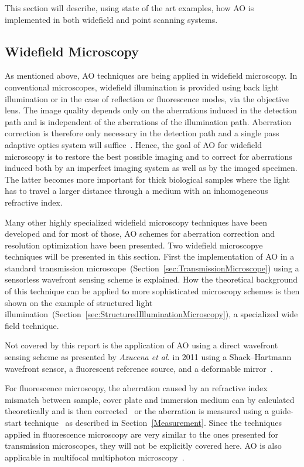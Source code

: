 This section will describe, using state of the art examples, how AO is implemented in both widefield and point scanning systems.  


\subsection{Widefield Microscopy}
\label{sec:WidefieldMicroscopy}

As mentioned above, AO techniques are being applied in widefield microscopy. In conventional microscopes, widefield illumination is provided using back light illumination or in the case of reflection or fluorescence modes, via the objective lens. The image quality depends only on the aberrations induced in the detection path and is independent of the aberrations of the illumination path. Aberration correction is therefore only necessary in the detection path and a single pass adaptive optics system will suffice~\cite{book_aberrations}. Hence, the goal of AO for widefield microscopy is to restore the best possible imaging and to correct for aberrations induced both by an imperfect imaging system as well as by the imaged specimen. The latter becomes more important for thick biological samples where the light has to travel a larger distance through a medium with an inhomogeneous refractive index. 

Many other highly specialized widefield microscopy techniques have been developed and for most of those, AO schemes for aberration correction and resolution optimization have been presented. Two widefield microscopye techniques will be presented in this section. First the implementation of AO in a standard transmission microscope~(Section~\ref{sec:TransmissionMicroscope}) using a sensorless wavefront sensing scheme is explained. How the theoretical background of this technique can be applied to more sophisticated microscopy schemes is then shown on the example of structured light illumination~(Section~\ref{sec:StructuredIlluminationMicroscopy}), a specialized wide field technique. 

Not covered by this report is the application of AO using a direct wavefront sensing scheme as presented by \emph{Azucena et al.} in 2011 using a Shack–Hartmann wavefront sensor, a fluorescent reference source, and a deformable mirror~\cite{wide_directSensing_microscope}.

For fluorescence microscopy, the aberration caused by an refractive index mismatch between sample, cover plate and immersion medium can by calculated theoretically and is then corrected~\cite{wide_AOM_FM_spehrical_correction} or the aberration is measured using a guide-start technique~\cite{wide_fluorescence_guide_star} as described in Section~\ref{Measurement}. Since the techniques applied in fluorescence microscopy are very similar to the ones presented for transmission microscopes, they will not be explicitly covered here. AO is also applicable in multifocal multiphoton microscopy~\cite{wide_MPFM,wide_MMM_AO}.

